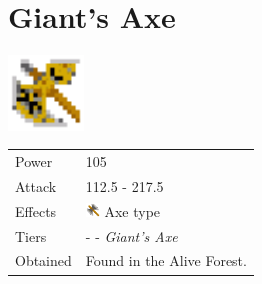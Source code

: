 \section{Giant's Axe}
\label{weapon:giants_axe}

\includegraphics[height=2cm,keepaspectratio]{./resources/weapons/giantsaxe}

\begin{longtable}{ l p{9cm} }
	Power
	& 105
\\ %
	Attack
	& 112.5 - 217.5
\\ %
	Effects
	& \includegraphics[height=1em,keepaspectratio]{./resources/effects/axe}
	Axe type
\\ %
	Tiers
	& \nameref{weapon:axe} - \nameref{weapon:battle_axe} - \textit{Giant's Axe}
\\ %
	Obtained
	& Found in the Alive Forest.
\end{longtable}
